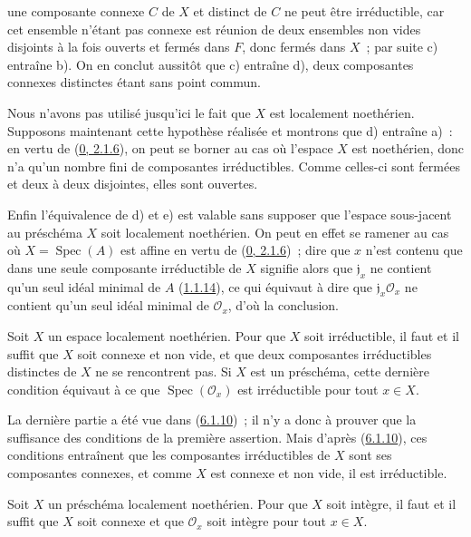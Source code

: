 une composante connexe $C$ de $X$ et distinct de $C$ ne peut être
irréductible, car cet ensemble n'étant pas connexe est réunion de deux
ensembles non vides disjoints à la fois ouverts et fermés dans $F$, donc
fermés dans $X$~; par suite c) entraîne b). On en conclut aussitôt que c)
entraîne d), deux composantes connexes distinctes étant sans point commun.

Nous n'avons pas utilisé jusqu'ici le fait que $X$ est localement noethérien.
Supposons maintenant cette hypothèse réalisée et montrons que d) entraîne
a)~: en vertu de (\hyperref[0.2.1.6-fr]{0, 2.1.6}), on peut se borner au cas
où l'espace $X$ est noethérien, donc n'a qu'un nombre fini de composantes
irréductibles. Comme celles-ci sont fermées et deux à deux disjointes, elles
sont ouvertes.

Enfin l'équivalence de d) et e) est valable sans supposer que l'espace
sous-jacent au préschéma $X$ soit localement noethérien. On peut en effet se
ramener au cas où $X=\operatorname{Spec}(A)$ est affine en vertu de
(\hyperref[0.2.1.6-fr]{0, 2.1.6})~; dire que $x$ n'est contenu que dans une
seule composante irréductible de $X$ signifie alors que $\mathfrak{j}_x$ ne
contient qu'un seul idéal minimal de $A$ (\hyperref[I.1.1.14-fr]{1.1.14}), ce
qui équivaut à dire que $\mathfrak{j}_x\mathscr{O}_x$ ne contient qu'un seul
idéal minimal de $\mathscr{O}_x$, d'où la conclusion.

\begin{corollary}[6.1.11]
\label{I.6.1.11-fr}
Soit $X$ un espace localement noethérien. Pour que $X$ soit irréductible, il
faut et il suffit que $X$ soit connexe et non vide, et que deux composantes
irréductibles distinctes de $X$ ne se rencontrent pas. Si $X$ est un
préschéma, cette dernière condition équivaut à ce que
$\operatorname{Spec}(\mathscr{O}_x)$ est irréductible pour tout $x\in X$.
\end{corollary}

La dernière partie a été vue dans (\hyperref[I.6.1.10-fr]{6.1.10})~; il n'y a
donc à prouver que la suffisance des conditions de la première assertion.
Mais d'après (\hyperref[I.6.1.10-fr]{6.1.10}), ces conditions entraînent que
les composantes irréductibles de $X$ sont ses composantes connexes, et comme
$X$ est connexe et non vide, il est irréductible.

\begin{corollary}[6.1.12]
\label{I.6.1.12-fr}
Soit $X$ un préschéma localement noethérien. Pour que $X$ soit intègre, il
faut et il suffit que $X$ soit connexe et que $\mathscr{O}_x$ soit intègre
pour tout $x\in X$.
\end{corollary}

